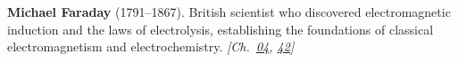 \textbf{Michael Faraday} (1791–1867). British scientist who discovered electromagnetic induction and the laws of electrolysis, establishing the foundations of classical electromagnetism and electrochemistry. \emph{[Ch.~\hyperref[ch:energytransmission]{04}, \hyperref[ch:iceslipperiness]{42}]}

